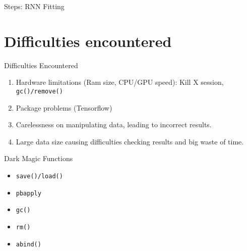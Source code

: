 \documentclass{beamer}
\begin{document}
\begin{frame}{Steps: RNN Fitting}
		
\end{frame}

\section{Difficulties encountered}%
\label{sec:difficulties_encountered}


\begin{frame}{Difficulties Encountered}
	\begin{enumerate}
		\item Hardware limitations (Ram size, CPU/GPU speed): Kill X session, \texttt{gc()/remove()}
		\item Package problems (Tensorflow)
		\item Carelessness on manipulating data, leading to incorrect results.
		\item Large data size causing difficulties checking results and big waste of time.
		

	\end{enumerate}
\end{frame}


\begin{frame}{Dark Magic Functions}
	\begin{itemize}
		\item \texttt{save()/load()}
		\item \texttt{pbapply}
		\item \texttt{gc()}
		\item \texttt{rm()}
		\item \texttt{abind()}

	\end{itemize}
	
\end{frame}
\end{document}
